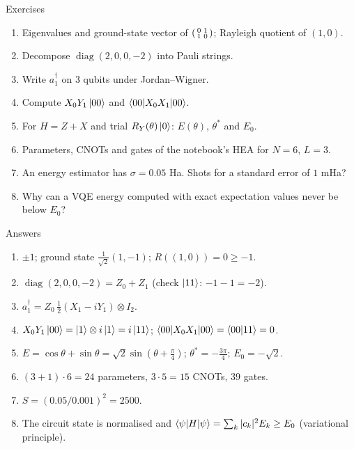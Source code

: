\documentclass[aspectratio=169,11pt]{beamer}
\begin{document}
\begin{frame}{Exercises}
  \begin{enumerate}
    \item Eigenvalues and ground-state vector of $\begin{psmallmatrix}0 & 1\\ 1 & 0\end{psmallmatrix}$; Rayleigh quotient of $(1, 0)$.
    \item Decompose $\operatorname{diag}(2, 0, 0, -2)$ into Pauli strings.
    \item Write $a_1^\dagger$ on 3 qubits under Jordan--Wigner.
    \item Compute $X_0Y_1\ket{00}$ and $\braket{00|X_0X_1|00}$.
    \item For $H = Z + X$ and trial $R_Y(\theta)\ket0$: $E(\theta)$, $\theta^*$ and $E_0$.
    \item Parameters, CNOTs and gates of the notebook's HEA for $N = 6$, $L = 3$.
    \item An energy estimator has $\sigma = 0.05$ Ha. Shots for a standard error of $1$ mHa?
    \item Why can a VQE energy computed with exact expectation values never be below $E_0$?
  \end{enumerate}
\end{frame}

\begin{frame}{Answers}
  \small
  \begin{enumerate}
    \item $\pm1$; ground state $\frac{1}{\sqrt2}(1, -1)$; $R((1, 0)) = 0 \ge -1$.
    \item $\operatorname{diag}(2, 0, 0, -2) = Z_0 + Z_1$ (check $\ket{11}$: $-1 - 1 = -2$).
    \item $a_1^\dagger = Z_0\,\tfrac12(X_1 - iY_1)\otimes I_2$.
    \item $X_0Y_1\ket{00} = \ket1\otimes i\ket1 = i\ket{11}$; $\braket{00|X_0X_1|00} = \braket{00|11} = 0$.
    \item $E = \cos\theta + \sin\theta = \sqrt2\sin(\theta + \frac\pi4)$; $\theta^* = -\frac{3\pi}{4}$; $E_0 = -\sqrt2$.
    \item $(3 + 1)\cdot6 = 24$ parameters, $3\cdot5 = 15$ CNOTs, $39$ gates.
    \item $S = (0.05/0.001)^2 = 2500$.
    \item The circuit state is normalised and $\braket{\psi|H|\psi} = \sum_k|c_k|^2E_k \ge E_0$ (variational principle).
  \end{enumerate}
\end{frame}
\end{document}
